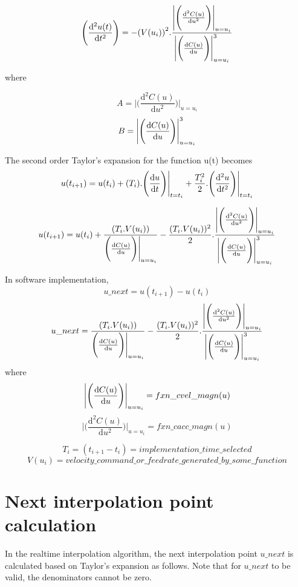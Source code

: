 \[ \Bigg ( \frac{\mathrm{d^2}u(t)}{\mathrm{d}t^2} \Bigg )  = - {(V(u_{i}))}^{2}. \frac{ \Bigg | {\Bigg (\frac{\mathrm{d^2}C(u)}{\mathrm{d}u^2} \Bigg ) \Bigg |_{u=u_{i}} } }{ \Bigg | {\Bigg ( \odv{C(u)}{u} \Bigg ) \Bigg |_{u=u_{i}} ^{3} }    }  \]

where 

\[ A = \Bigg | {\Bigg ( \frac{\mathrm{d^2}C(u)}{\mathrm{d}u^2} \Bigg ) \Bigg |_{u=u_{i}} }  \]
\[ B = \Bigg | {\Bigg ( \odv{C(u)}{u} \Bigg ) \Bigg |_{u=u_{i}} ^{3} }  \]

The second order Taylor's expansion for the function u(t) becomes
\[ u(t_{i+1}) = u(t_{i}) + (T_{i}).{\Bigg ( \odv{u}{t} \Bigg ) \Bigg |_{t=t_{i}}} + \frac{T_{i}^{2}}{2}.{\Bigg ( \frac{\mathrm{d^2}u}{\mathrm{d}t^2} \Bigg ) \Bigg |_{t=t_{i}}} \]

\[ u(t_{i+1}) = u(t_{i}) + \frac{(T_{i}.V(u_{i}))} {\Bigg ( \odv{C(u)}{u} \Bigg ) \Bigg |_{u=u_{i}}} - \frac{ (T_{i}.V(u_{i})) ^{2}}{2}. \frac{ \Bigg | {\Bigg ( \frac{\mathrm{d^2}C(u)}{\mathrm{d}u^2} \Bigg ) \Bigg |_{u=u_{i}} } }{ \Bigg | {\Bigg ( \odv{C(u)}{u} \Bigg ) \Bigg |_{u=u_{i}} ^{3} } } \]

In software implementation,
\[ u\_next = u(t_{i+1}) - u(t_{i}) \]
\[ u\_next =  \frac{(T_{i}.V(u_{i}))} {\Bigg ( \odv{C(u)}{u} \Bigg ) \Bigg |_{u=u_{i}}} - \frac{ (T_{i}.V(u_{i})) ^{2}}{2}. \frac{ \Bigg | {\Bigg (  \frac{\mathrm{d^2}C(u)}{\mathrm{d}u^2} \Bigg ) \Bigg |_{u=u_{i}} } }{ \Bigg | {\Bigg ( \odv{C(u)}{u} \Bigg ) \Bigg |_{u=u_{i}} ^{3} } } \]
where
\[ \Bigg | \Bigg ( \odv{C(u)}{u} \Bigg ) \Bigg |_{u=u_{i}}  = fxn\_cvel\_magn(u) \]
\[ \Bigg | \Bigg ( \frac{\mathrm{d^2}C(u)}{\mathrm{d}u^2} \Bigg ) \Bigg |_{u=u_{i}} = fxn\_cacc\_magn(u) \]

\[  T_{i}    = (t_{i+1} -t_{i}) = implementation\_time\_selected     \]
\[  V(u_{i}) = velocity\_command\_or\_feedrate\_generated\_by\_some\_function \]


\section{Next interpolation point calculation}

In the realtime interpolation algorithm, the next interpolation point $u\_next$ is calculated based on Taylor's expansion as follows. Note that for $u\_next$ to be valid, the denominators cannot be zero.\\

